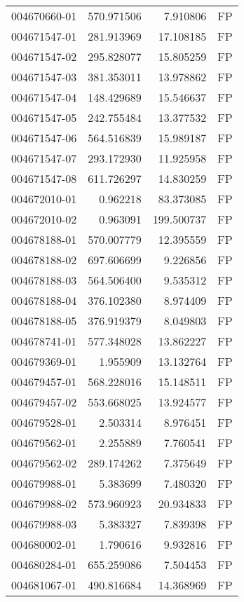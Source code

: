 \begin{tabular}{lrrl}
004670660-01 &  570.971506 &     7.910806 &   FP \\
004671547-01 &  281.913969 &    17.108185 &   FP \\
004671547-02 &  295.828077 &    15.805259 &   FP \\
004671547-03 &  381.353011 &    13.978862 &   FP \\
004671547-04 &  148.429689 &    15.546637 &   FP \\
004671547-05 &  242.755484 &    13.377532 &   FP \\
004671547-06 &  564.516839 &    15.989187 &   FP \\
004671547-07 &  293.172930 &    11.925958 &   FP \\
004671547-08 &  611.726297 &    14.830259 &   FP \\
004672010-01 &    0.962218 &    83.373085 &   FP \\
004672010-02 &    0.963091 &   199.500737 &   FP \\
004678188-01 &  570.007779 &    12.395559 &   FP \\
004678188-02 &  697.606699 &     9.226856 &   FP \\
004678188-03 &  564.506400 &     9.535312 &   FP \\
004678188-04 &  376.102380 &     8.974409 &   FP \\
004678188-05 &  376.919379 &     8.049803 &   FP \\
004678741-01 &  577.348028 &    13.862227 &   FP \\
004679369-01 &    1.955909 &    13.132764 &   FP \\
004679457-01 &  568.228016 &    15.148511 &   FP \\
004679457-02 &  553.668025 &    13.924577 &   FP \\
004679528-01 &    2.503314 &     8.976451 &   FP \\
004679562-01 &    2.255889 &     7.760541 &   FP \\
004679562-02 &  289.174262 &     7.375649 &   FP \\
004679988-01 &    5.383699 &     7.480320 &   FP \\
004679988-02 &  573.960923 &    20.934833 &   FP \\
004679988-03 &    5.383327 &     7.839398 &   FP \\
004680002-01 &    1.790616 &     9.932816 &   FP \\
004680284-01 &  655.259086 &     7.504453 &   FP \\
004681067-01 &  490.816684 &    14.368969 &   FP \\

\end{tabular}
